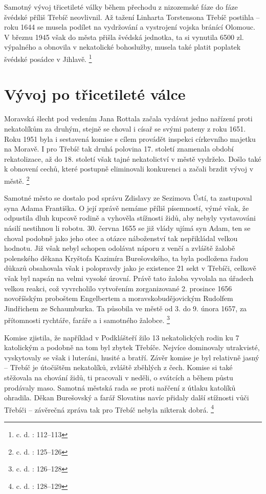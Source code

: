 \documentclass[a4paper,oneside,12p]{report}
\begin{document}
Samotný vývoj třicetileté války během přechodu z nizozemské fáze do fáze švédské příliš Třebíč neovlivnil.
Až tažení Linharta Torstensona Třebíč postihla -- roku 1644 se musela podílet na vydržování a vystrojení vojska bránící Olomouc.
V březnu 1945 však do města přišla švédská jednotka, ta si vynutila 6500 zl. výpalného a obnovila v nekatolické bohoslužby, musela také platit poplatek švédské posádce v Jihlavě. \footnote{c. d. : 112--113}

\section{Vývoj po třicetileté válce}

Moravská šlecht pod vedením Jana Rottala začala vydávat jedno nařízení proti nekatolíkům za druhým, stejně se choval i císař se svými pateny z roku 1651.
Roku 1951 byla i sestavená komise s cílem provádět inspekci církevního majetku na Moravě.
I pro Třebíč tak druhá polovina 17. století znamenala období rekatolizace, až do 18. století však tajné nekatolictví v městě vydrželo.
Došlo také k obnovení cechů, které postupně eliminovali konkurenci a začali brzdit vývoj v městě. \footnote{c. d. : 125--126}

Samotné město se dostalo pod správu Zdislavy ze Sezimova Ústí, ta zastupoval syna Adama Františka.
O její zprávě nemáme příliš písemností, výmé však, že odpustila dluh kupcově rodině a vyhověla stížnosti židů, aby nebyly vystavováni násilí nestihnou li robotu.
30. června 1655 se již vlády ujímá syn Adam, ten se choval podobně jako jeho otec a otázce náboženství tak nepřikládal velkou hodnotu.
Již však nebyl schopen odolávat náporu z venčí a zvláště žalobě polenského děkana Kryštofa Kazimíra Burešovského, ta byla podložena řadou důkazů obsahovala však i polopravdy jako je existence 21 sekt v Třebíči, celkově však byl napsán na velmi vysoké úrovní.
Právě tato žaloba vyvolala na úřadech velkou reakci, což vyvrcholilo vytvořením  zorganizované 2. prosince 1656 novoříšským proboštem Engelbertem a moravskobudějovickým Rudolfem Jindřichem ze Schaumburka.
Ta působila ve městě od 3. do 9. února 1657, za přítomnosti rychtáře, faráře a i samotného žalobce. \footnote{c. d. : 126--128}

Komise zjistila, že například v Podklášteří žilo 13 nekatolických rodin ku 7 katolickým a podobně na tom byl zbytek Třebíče.
Nejvíce dominovaly utrakvisté, vyskytovaly se však i luteráni, husité a  bratří.
Závěr komise je byl relativně jasný -- Třebíč je útočištěm nekatolíků, zvláště zběhlých z čech.
Komise si také stěžovala na chování židů, ti pracovali v neděli, o svátcích a během půstu prodávaly maso.
Samotná městská rada se proti nařčení z útlaku katolíků ohradila.
Děkan Burešovský a farář Slovatius navíc přidaly další stížnosti vůči Třebíči -- závěrečná zpráva tak pro Třebíč nebyla nikterak dobrá.  \footnote{c. d. : 128--129}
\end{document}
